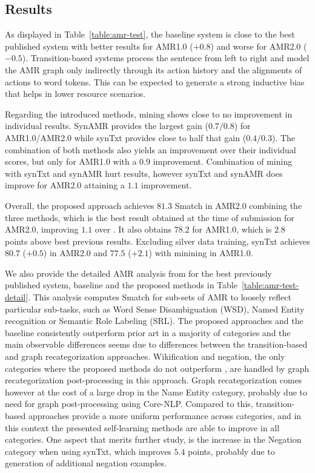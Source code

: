 \documentclass[11pt,a4paper]{article}
\begin{document}
\subsection{Results}

As displayed in Table~\ref{table:amr-test}, the baseline system is close to the best published system with better results for AMR1.0 ($+0.8$) and worse for AMR2.0 ($-0.5$). Transition-based systems process the sentence from left to right and model the AMR graph only indirectly through its action history and the alignments of actions to word tokens. This can be expected to generate a strong inductive bias that helps in lower resource scenarios. 

Regarding the introduced methods, mining shows close to no improvement in individual results. SynAMR provides the largest gain ($0.7/0.8$) for AMR1.0/AMR2.0 while synTxt provides close to half that gain ($0.4/0.3$). The combination of both methods also yields an improvement over their individual scores, but only for AMR1.0 with a $0.9$ improvement. Combination of mining with synTxt and synAMR hurt results, however synTxt and synAMR does improve for AMR2.0 attaining a $1.1$ improvement.

Overall, the proposed approach achieves $81.3$ Smatch in AMR2.0 combining the three methods, which is the best result obtained at the time of submission for AMR2.0, improving $1.1$ over \cite{cai2020amr}. It also obtains $78.2$ for AMR1.0, which is $2.8$ points above best previous results. Excluding silver data training, synTxt achieves $80.7$ ($+0.5$) in AMR2.0 and $77.5$ ($+2.1$) with minining in AMR1.0.

We also provide the detailed AMR analysis from \cite{damonte-etal-2017-incremental} for the best previously published system, baseline and the proposed methods in Table~\ref{table:amr-test-detail}. This analysis computes Smatch for sub-sets of AMR to loosely reflect particular sub-tasks, such as Word Sense Disambiguation (WSD), Named Entity recognition or Semantic Role Labeling (SRL). The proposed approaches and the baseline consistently outperform prior art in a majority of categories and the main observable differences seems due to differences between the transition-based and graph recategorization approaches. Wikification and negation, the only categories where the proposed methods do not outperform \cite{cai2020amr}, are handled by graph recategorization post-processing in this approach. Graph recategorization comes however at the cost of a large drop in the Name Entity category, probably due to need for graph post-processing using Core-NLP. Compared to this, transition-based approaches provide a more uniform performance across categories, and in this context the presented self-learning methods are able to improve in all categories. One aspect that merits further study, is the increase in the Negation category when using synTxt, which improves $5.4$ points, probably due to generation of additional negation examples.
\end{document}
